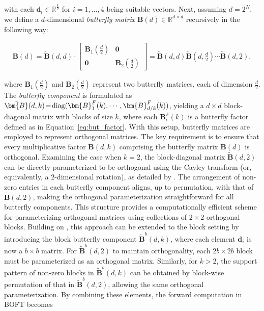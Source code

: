 with each $\bm{d}_i\in\mathbb{R}^{\frac{k}{2}}$ for $i=1,\dots,4$ being suitable vectors. Next, assuming $d=2^N$, we define a $d$-dimensional \emph{butterfly matrix} $\bm{B}(d)\in\mathbb{R}^{d\times d}$ recursively in the following way:

\begin{equation}
\begin{aligned}
    \!\!\bm{B}(d)=\tilde{\bm{B}}(d,d)\!\cdot\!\begin{bmatrix}
    \bm{B}_1(\frac{d}{2})\!\!\!\!\! & \bm{0} \\
    \bm{0}\!\!\!\!\! &\bm{B}_2(\frac{d}{2})
    \end{bmatrix}= \tilde{\bm{B}}(d,d)\tilde{\bm{B}}(d,\frac{d}{2})\cdots\tilde{\bm{B}}(d,2),
\end{aligned}
\end{equation}

where $\bm{B}_1(\frac{d}{2})$ and $\bm{B}_2(\frac{d}{2})$ represent two butterfly matrices, each of dimension $\frac{d}{2}$. The \emph{butterfly component} is formulated as $\thickmuskip=2mu \medmuskip=2mu \tilde{\bm{B}}(d,k)=\text{diag}(\bm{B}^F_1(k),\cdots,\bm{B}^F_{d/k}(k))$, yielding a $d\times d$ block-diagonal matrix with blocks of size $k$, where each $\bm{B}^F_i(k)$ is a butterfly factor defined as in Equation~\ref{eq:but_factor}. With this setup, butterfly matrices are employed to represent orthogonal matrices. The key requirement is to ensure that every multiplicative factor $\tilde{\bm{B}}(d,k)$ comprising the butterfly matrix $\bm{B}(d)$ is orthogonal. Examining the case when $k=2$, the block-diagonal matrix $\tilde{\bm{B}}(d,2)$ can be directly parameterized to be orthogonal using the Cayley transform (or, equivalently, a $2$-dimensional rotation), as detailed by \cite{liu2021orthogonal,qiu2023controlling}. The arrangement of non-zero entries in each butterfly component aligns, up to permutation, with that of $\tilde{\bm{B}}(d,2)$, making the orthogonal parameterization straightforward for all butterfly components. This structure provides a computationally efficient scheme for parameterizing orthogonal matrices using collections of $2\times 2$ orthogonal blocks. Building on \cite{chen2022pixelated}, this approach can be extended to the block setting by introducing the block butterfly component $\tilde{\bm{B}}^b(d,k)$, where each element $\bm{d}_i$ is now a $b\times b$ matrix. For $\tilde{\bm{B}}^b(d,2)$ to maintain orthogonality, each $2b\times 2b$ block must be parameterized as an orthogonal matrix. Similarly, for $k>2$, the support pattern of non-zero blocks in $\tilde{\bm{B}}^b(d,k)$ can be obtained by block-wise permutation of that in $\tilde{\bm{B}}^b(d,2)$, allowing the same orthogonal parameterization. By combining these elements, the forward computation in BOFT becomes

